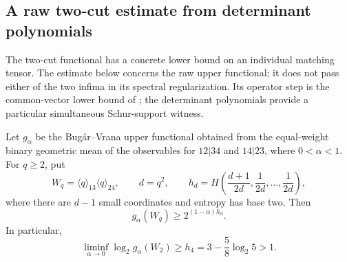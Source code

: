 \subsection{A raw two-cut estimate from determinant polynomials}
\label{subsec:binary-raw-surplus}

The two-cut functional has a concrete lower bound on an individual
matching tensor. The estimate below concerns the raw upper functional;
it does not pass either of the two infima in its spectral regularization.
Its operator step is the common-vector lower bound of
\cite[Section~2.4, equation~(41)]{BugarVrana2025}; the determinant
polynomials provide a particular simultaneous Schur-support witness.

\begin{proposition}
\label{prop:binary-raw-surplus}
Let $g_\alpha$ be the Bug\'ar--Vrana upper functional obtained from
the equal-weight binary geometric mean of the observables for
$12|34$ and $14|23$, where $0<\alpha<1$. For $q\geq2$, put
\[
 W_q=\langle q\rangle_{13}\langle q\rangle_{24},\qquad d=q^2,
 \qquad
 h_d=H\left(\frac{d+1}{2d},\frac1{2d},\ldots,\frac1{2d}\right),
\]
where there are $d-1$ small coordinates and entropy has base two.
Then
\begin{equation}\label{eq:binary-raw-surplus}
 g_\alpha(W_q)\geq2^{(1-\alpha)h_d}.
\end{equation}
In particular,
\[
 \liminf_{\alpha\to0}\log_2g_\alpha(W_2)
 \geq h_4=3-\frac58\log_2 5>1.
\]
\end{proposition}
